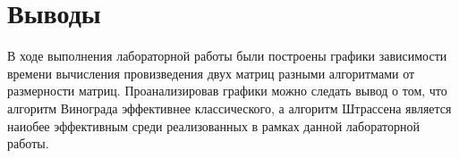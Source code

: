 \documentclass[a4paper, 14pt]{extarticle}
\begin{document}
\section{Выводы}\label{Sect::conclusion}

В ходе выполнения лабораторной работы были построены графики зависимости времени вычисления провизведения двух матриц разными алгоритмами от размерности матриц. Проанализировав графики можно следать вывод о том, что алгоритм Винограда эффективнее классического, а алгоритм Штрассена является наиобее эффективным среди реализованных в рамках данной лабораторной работы.
\end{document}
